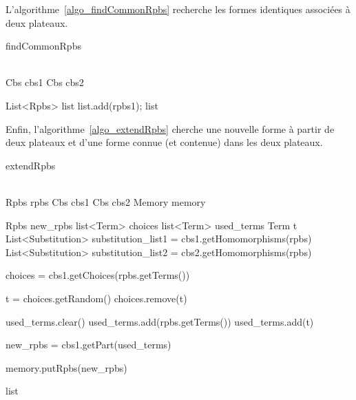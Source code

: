 L'algorithme~\vref{algo_findCommonRpbs} recherche les formes identiques associées à deux plateaux.
 
\begin{algorithm}[H]
	\caption{findCommonRpbs}
	\label{algo_findCommonRpbs}
	\KwData
	{
		\\
		Cbs cbs1\;
		Cbs cbs2\;
	}	
  \vspace{0.2cm}
  
  List<Rpbs> list\;
		{
				{
					{
						list.add(rpbs1);
					}
				}
		}
		\Return list\;
\end{algorithm}

Enfin, l'algorithme~\vref{algo_extendRpbs} cherche une nouvelle forme à partir de deux plateaux et d'une forme connue (et contenue) dans les deux plateaux.


\begin{algorithm}[H]
	\caption{extendRpbs}
	\label{algo_extendRpbs}
	\KwData
	{
	\\
		Rpbs rpbs\;
		Cbs cbs1\;
		Cbs cbs2\;
		Memory memory\;
	}	
  \vspace{0.2cm}
  
  Rpbs new\_rpbs\;
  list<Term> choices\;
  list<Term> used\_terms\;
  Term t\;
	List<Substitution> substitution\_list1 = cbs1.getHomomorphisms(rpbs)\;
  List<Substitution> substitution\_list2 = cbs2.getHomomorphisms(rpbs)\;

		{
			
			choices = cbs1.getChoices(rpbs.getTerms())\;
				{
					t = choices.getRandom()\;
					choices.remove(t)\;
					
					used\_terms.clear()\;
					used\_terms.add(rpbs.getTerms())\;
					used\_terms.add(t)\;
						
					new\_rpbs = cbs1.getPart(used\_terms)\;
						{
							{
								{
									memory.putRpbs(new\_rpbs)\;
								}
							
							}
						}
				}
		}
		\Return list\;
\end{algorithm}


